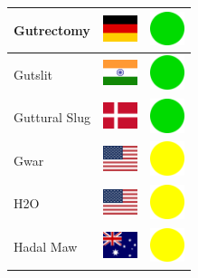 \documentclass[12pt, a4paper, twoside]{report}
\begin{document}
\begin{center}
\begin{longtable}{|p{5cm}|p{2cm}|p{2cm}|}
 Gutrectomy                                                 & \includegraphics[width=1cm]{../img/flags/de} &   \includegraphics[width=1cm]{../likes/y} \\ \hline
 Gutslit                                                    & \includegraphics[width=1cm]{../img/flags/in} &   \includegraphics[width=1cm]{../likes/y} \\ \hline
 Guttural Slug                                              & \includegraphics[width=1cm]{../img/flags/dk} &   \includegraphics[width=1cm]{../likes/y} \\ \hline
 Gwar                                                       & \includegraphics[width=1cm]{../img/flags/us} &   \includegraphics[width=1cm]{../likes/m} \\ \hline
 H2O                                                        & \includegraphics[width=1cm]{../img/flags/us} &   \includegraphics[width=1cm]{../likes/m} \\ \hline
 Hadal Maw                                                  & \includegraphics[width=1cm]{../img/flags/au} &   \includegraphics[width=1cm]{../likes/m} \\ \hline

\end{longtable}
\end{center}
\end{document}
